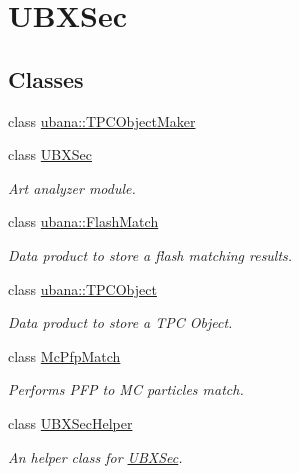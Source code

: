 \hypertarget{group__UBXSec}{\section{\-U\-B\-X\-Sec}
\label{group__UBXSec}
}
\subsection*{\-Classes}
\begin{DoxyCompactItemize}
\item 
class \hyperlink{classubana_1_1TPCObjectMaker}{ubana\-::\-T\-P\-C\-Object\-Maker}
\item 
class \hyperlink{classUBXSec}{\-U\-B\-X\-Sec}
\begin{DoxyCompactList}\small\item\em \-Art analyzer module. \end{DoxyCompactList}\item 
class \hyperlink{classubana_1_1FlashMatch}{ubana\-::\-Flash\-Match}
\begin{DoxyCompactList}\small\item\em \-Data product to store a flash matching results. \end{DoxyCompactList}\item 
class \hyperlink{classubana_1_1TPCObject}{ubana\-::\-T\-P\-C\-Object}
\begin{DoxyCompactList}\small\item\em \-Data product to store a \-T\-P\-C \-Object. \end{DoxyCompactList}\item 
class \hyperlink{classMcPfpMatch}{\-Mc\-Pfp\-Match}
\begin{DoxyCompactList}\small\item\em \-Performs \-P\-F\-P to \-M\-C particles match. \end{DoxyCompactList}\item 
class \hyperlink{classUBXSecHelper}{\-U\-B\-X\-Sec\-Helper}
\begin{DoxyCompactList}\small\item\em \-An helper class for \hyperlink{classUBXSec}{\-U\-B\-X\-Sec}. \end{DoxyCompactList}\end{DoxyCompactItemize}
